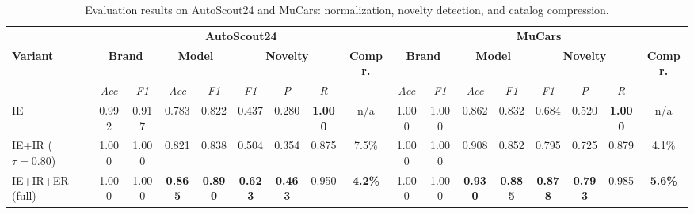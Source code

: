 \documentclass[conference]{IEEEtran}
\begin{document}
\begin{table}[htbp]
\caption{Evaluation results on AutoScout24 and MuCars:
normalization, novelty detection, and catalog compression.}
\begin{center}
\footnotesize
\setlength{\tabcolsep}{4pt}
\begin{tabular}{|l|cc|cc|ccc|c|cc|cc|ccc|c|}
\hline
 & \multicolumn{8}{c|}{\textbf{AutoScout24}}
 & \multicolumn{8}{c|}{\textbf{MuCars}} \\
\cline{2-17}
\textbf{Variant}
 & \multicolumn{2}{c|}{\textbf{Brand}}
 & \multicolumn{2}{c|}{\textbf{Model}}
 & \multicolumn{3}{c|}{\textbf{Novelty}}
 & \textbf{Compr.}
 & \multicolumn{2}{c|}{\textbf{Brand}}
 & \multicolumn{2}{c|}{\textbf{Model}}
 & \multicolumn{3}{c|}{\textbf{Novelty}}
 & \textbf{Compr.} \\
\cline{2-3}\cline{4-5}\cline{6-8}\cline{10-11}\cline{12-13}\cline{14-16}
 & \textit{Acc} & \textit{F1}
 & \textit{Acc} & \textit{F1}
 & \textit{F1} & \textit{P} & \textit{R}
 &
 & \textit{Acc} & \textit{F1}
 & \textit{Acc} & \textit{F1}
 & \textit{F1} & \textit{P} & \textit{R}
 & \\
\hline
IE                      & 0.992 & 0.917 & 0.783 & 0.822 & 0.437 & 0.280 & \textbf{1.000} & n/a
                        & 1.000 & 1.000 & 0.862 & 0.832 & 0.684 & 0.520 & \textbf{1.000} & n/a \\
IE+IR ($\tau = 0.80$)   & 1.000 & 1.000 & 0.821 & 0.838 & 0.504 & 0.354 & 0.875 & 7.5\%
                        & 1.000 & 1.000 & 0.908 & 0.852 & 0.795 & 0.725 & 0.879 & 4.1\% \\
IE+IR+ER (full)         & 1.000 & 1.000 & \textbf{0.865} & \textbf{0.890} & \textbf{0.623} & \textbf{0.463} & 0.950 & \textbf{4.2\%}
                        & 1.000 & 1.000 & \textbf{0.930} & \textbf{0.885} & \textbf{0.878} & \textbf{0.793} & 0.985 & \textbf{5.6\%} \\
\hline
\end{tabular}
\label{tab:results}
\end{center}
\end{table}
\end{document}
